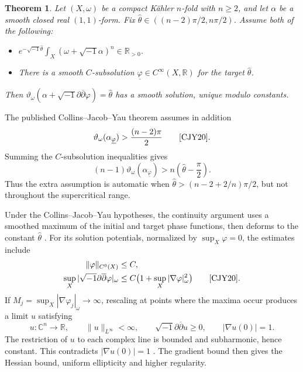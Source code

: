 \documentclass[12pt,reqno]{amsart}
\numberwithin{equation}{section}
\theoremstyle{plain}
\newcommand{\recallheading}{Theorem}
\newtheorem*{recalledtheorem}{\recallheading}
\newenvironment{theoremrecall}[1]{%
 \renewcommand{\recallheading}{Theorem~\ref{#1} (recalled)}%
 \begin{recalledtheorem}%
}{\end{recalledtheorem}}
\theoremstyle{definition}
\newcommand{\ddbar}{\sqrt{-1}\partial\overline{\partial}}
\newcommand{\R}{\mathbb R}
\newcommand{\C}{\mathbb C}
\newcommand{\SubsolutionStatement}{%
Let $(X,\omega)$ be a compact K\"ahler $n$-fold with $n\geq2$, and
let $\alpha$ be a smooth closed real $(1,1)$-form. Fix
$\widehat\theta\in((n-2)\pi/2,n\pi/2)$. Assume both of the following:
\begin{itemize}
\item $e^{-\sqrt{-1}\widehat\theta}\int_X(\omega+\sqrt{-1}\alpha)^n
\in\R_{>0}$.
\item There is a smooth $C$-subsolution
$\underline\varphi\in C^\infty(X,\R)$ for the target $\widehat\theta$.
\end{itemize}
Then $\vartheta_\omega(\alpha+\ddbar\varphi)=\widehat\theta$ has a
smooth solution, unique modulo constants.
}
\begin{document}
\begin{theoremrecall}{thm-subsolution-existence}
\SubsolutionStatement
\end{theoremrecall}

The published Collins--Jacob--Yau theorem assumes in addition
\[
 \vartheta_\omega(\alpha_{\underline\varphi})>\frac{(n-2)\pi}{2}
 \qquad\text{\cite[Theorem 1.2]{CJY20}}.
\]
Summing the $C$-subsolution inequalities gives
\[
 (n-1)\vartheta_\omega(\alpha_{\underline\varphi})
 >n\left(\widehat\theta-\frac\pi2\right).
\]
Thus the extra assumption is automatic when
$\widehat\theta>(n-2+2/n)\pi/2$, but not throughout the supercritical range.

Under the Collins--Jacob--Yau hypotheses, the continuity argument
uses a smoothed maximum of the initial and target phase functions,
then deforms to the constant $\widehat\theta$
\cite[Section 7]{CJY20}. For its solution potentials, normalized by
$\sup_X\varphi=0$, the estimates include
\begin{align*}
 \|\varphi\|_{C^0(X)}&\leq C,\\
 \sup_X|\ddbar\varphi|_\omega
 &\leq C\bigl(1+\sup_X|\nabla\varphi|_\omega^2\bigr)
 \qquad\text{\cite[Proposition 3.6 and Theorem 4.1]{CJY20}}.
\end{align*}
If $M_j=\sup_X|\nabla\varphi_j|_\omega\to\infty$, rescaling at points
where the maxima occur produces a limit $u$ satisfying
\[
 u\colon\C^n\longrightarrow\R,\qquad
 \|u\|_{L^\infty}<\infty,\qquad
 \sqrt{-1}\partial\overline\partial u\geq0,\qquad |\nabla u(0)|=1.
\]
The restriction of $u$ to each complex line is bounded and subharmonic,
hence constant. This contradicts $|\nabla u(0)|=1$
\cite[Proposition 5.1]{CJY20}. The gradient bound then gives the Hessian
bound, uniform ellipticity and higher regularity.
\end{document}
